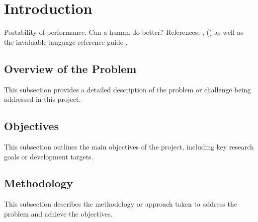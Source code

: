% 

\section{Introduction}  %
Portability	of performance. Can a human do better? References: \cite{numrich2018parallel, ray2019fortran}, (\cite{markus2012modern, clerman2011modern, Hanson2013}) as well as the invaluable language reference guide \cite{metcalf2024modern}.	

\subsection{Overview of the Problem}
This subsection provides a detailed description of the problem or challenge being addressed in this project.

\subsection{Objectives}
This subsection outlines the main objectives of the project, including key research goals or development targets.

\subsection{Methodology}
This subsection describes the methodology or approach taken to address the problem and achieve the objectives.

\endinput  %
